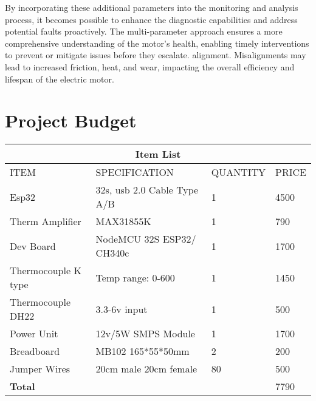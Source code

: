 By incorporating these additional parameters into the monitoring and analysis process, it becomes possible to enhance the diagnostic capabilities and address potential faults proactively. The multi-parameter approach ensures a more comprehensive understanding of the motor's health, enabling timely interventions to prevent or mitigate issues before they escalate.
alignment. Misalignments may lead to increased friction, heat, and wear, impacting the overall efficiency and lifespan of the electric motor.
\pagebreak


\section{Project Budget}
\setlength{\arrayrulewidth}{0.5mm}
\setlength{\tabcolsep}{18pt}
\renewcommand{\arraystretch}{1.5}
\begin{tabular}{ |p{2.5cm}|p{3.5cm}|p{2.5cm}|p{2.5cm}|  }
	\hline
	\multicolumn{4}{|c|}{\textbf{Item List}} \\
	\hline
	ITEM & SPECIFICATION & QUANTITY & PRICE \\
	\hline
	Esp32 & 32s, usb 2.0 Cable Type A/B & 1 & 4500 \\
	\hline
	Therm Amplifier & MAX31855K & 1 & 790 \\
	\hline
	Dev Board & NodeMCU 32S ESP32/ CH340c  & 1 & 1700\\
	\hline
	Thermocouple K type&Temp range: 0-600  & 1 & 1450\\
	\hline
	Thermocouple DH22 & 3.3-6v input  & 1 & 500\\
	\hline
	Power Unit & 12v/5W SMPS Module & 1   & 1700\\
	\hline
	Breadboard & MB102  165*55*50mm & 2 & 200\\
	\hline
	Jumper Wires & 20cm male 20cm female & 80 & 500 \\
	\hline
	\textbf{Total} & & &7790 \\
	\hline
\end{tabular}



